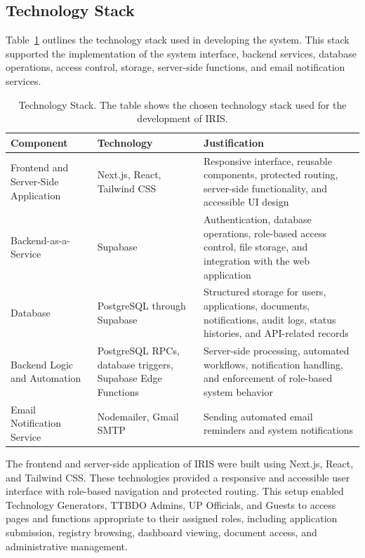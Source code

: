 \subsection{Technology Stack}

Table~\ref{tab:tech_stack} outlines the technology stack used in developing the system. This stack supported the implementation of the system interface, backend services, database operations, access control, storage, server-side functions, and email notification services.

\begingroup
\setlength{\tabcolsep}{6pt}
\renewcommand{\arraystretch}{1.05}
\small
\begin{table}[H]
  \captionsetup{justification=raggedright,singlelinecheck=false}
  \caption[Technology Stack]{Technology Stack. The table shows the chosen technology stack used for the development of IRIS.}
  \label{tab:tech_stack}
  \begin{tabular}{|p{3cm}|p{5cm}|p{6.2cm}|}
    \hline
    \textbf{Component} & \textbf{Technology} & \textbf{Justification} \\
    \hline
    Frontend and Server-Side Application & Next.js, React, Tailwind CSS & Responsive interface, reusable components, protected routing, server-side functionality, and accessible UI design \\
    \hline
    Backend-as-a-Service & Supabase & Authentication, database operations, role-based access control, file storage, and integration with the web application \\
    \hline
    Database & PostgreSQL through Supabase & Structured storage for users, applications, documents, notifications, audit logs, status histories, and API-related records \\
    \hline
    Backend Logic and Automation & PostgreSQL RPCs, database triggers, Supabase Edge Functions & Server-side processing, automated workflows, notification handling, and enforcement of role-based system behavior \\
    \hline
    Email Notification Service & Nodemailer, Gmail SMTP & Sending automated email reminders and system notifications \\
    \hline
  \end{tabular}
\end{table}
\endgroup

The frontend and server-side application of IRIS were built using Next.js, React, and Tailwind CSS. These technologies provided a responsive and accessible user interface with role-based navigation and protected routing. This setup enabled Technology Generators, TTBDO Admins, UP Officials, and Guests to access pages and functions appropriate to their assigned roles, including application submission, registry browsing, dashboard viewing, document access, and administrative management.

